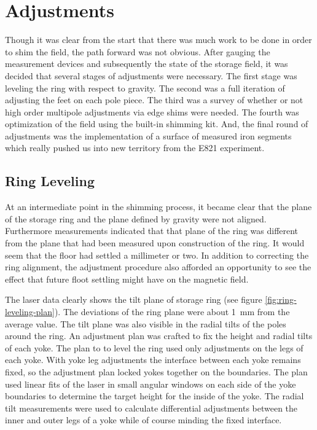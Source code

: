 \section{Adjustments}

Though it was clear from the start that there was much work to be done in order to shim the field, the path forward was not obvious.  After gauging the measurement devices and subsequently the state of the storage field, it was decided that several stages of adjustments were necessary.  The first stage was leveling the ring with respect to gravity.  The second was a full iteration of adjusting the feet on each pole piece.  The third was a survey of whether or not high order multipole adjustments via edge shims were needed.  The fourth was optimization of the field using the built-in shimming kit.  And, the final round of adjustments was the implementation of a surface of measured iron segments which really pushed us into new territory from the E821 experiment.

\subsection{Ring Leveling}
At an intermediate point in the shimming process, it became clear that the plane of the storage ring and the plane defined by gravity were not aligned.  Furthermore measurements indicated that that plane of the ring was different from the plane that had been measured upon construction of the ring.  It would seem that the floor had settled a millimeter or two.  In addition to correcting the ring alignment, the adjustment procedure also afforded an opportunity to see the effect that future floot settling might have on the magnetic field.

The laser data clearly shows the tilt plane of storage ring (see figure \ref{fig:ring-leveling-plan}).  The deviations of the ring plane were about \SI{1}{\milli\meter} from the average value.  The tilt plane was also visible in the radial tilts of the poles around the ring.  An adjustment plan was crafted to fix the height and radial tilts of each yoke.  The plan to to level the ring used only adjustments on the legs of each yoke. With yoke leg adjustments the interface between each yoke remains fixed, so the adjustment plan locked yokes together on the boundaries.  The plan used linear fits of the laser in small angular windows on each side of the yoke boundaries to determine the target height for the inside of the yoke.  The radial tilt measurements were used to calculate differential adjustments between the inner and outer legs of a yoke while of course minding the fixed interface. 

